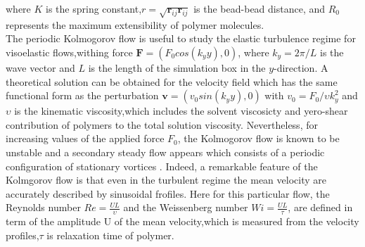 \documentclass[aps,prl,twocolumn,showpacs,superscriptaddress,groupedaddress]{revtex4}  %
\begin{document}
where $K$ is the spring constant,$r=\sqrt{\mathbf{r}_{ij}\mathbf{r}_{ij}}$ is the bead-bead
distance, and $R_0$ represents the maximum extensibility of polymer molecules.\\
The periodic Kolmogorov flow is useful to study the elastic turbulence regime for visoelastic flows,withing force $\mathbf{F}=(F_0cos(k_yy),0)$,
where $k_y= 2\pi/L$ is the wave vector and $L$ is the length of the simulation box in the $y$-direction. A theoretical solution can be obtained for the 
velocity field which has the same functional form as the perturbation $\mathbf{v}=(v_0sin(k_yy),0)$
with $ v_0=F_0/\upsilon k_{y}^{2}$ and $\upsilon$ is the kinematic viscosity,which includes the solvent viscosicty and yero-shear contribution of polymers to the total solution viscosity. Nevertheless, for increasing values of the applied force $F_0$,
the Kolmogorov flow is known to be unstable and a secondary steady flow appears which consists of a periodic configuration of stationary vortices \cite{posch97}.
Indeed, a remarkable feature of the Kolmgorov flow is that even in the turbulent regime the mean velocity are accurately described by sinusoidal frofiles\cite{boffetta05}.
Here for this particular flow, the Reynolds number $Re=\frac{UL}{\upsilon}$ and the Weissenberg number $Wi=\frac{UL}{\tau}$, are defined in term of the amplitude U of the mean velocity,which is 
measured from the velocity profiles,$\tau$ is relaxation time of polymer.
\end{document}
